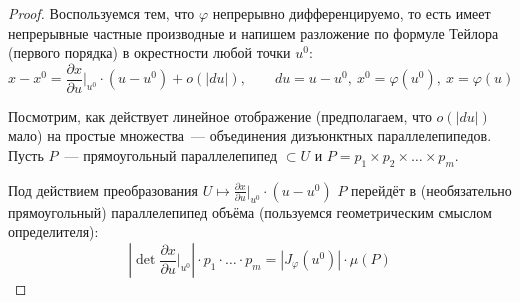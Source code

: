 \begin{proof}
    Воспользуемся тем, что $\varphi$ непрерывно дифференцируемо, то есть имеет непрерывные частные производные и напишем разложение по формуле Тейлора (первого порядка) в окрестности любой точки $u^0$:
    \begin{equation*}
        x-x^0 = \frac{\partial x}{\partial u}\Bigg|_{u^0} \cdot (u - u^0) + o(\lvert du \rvert), \hspace{2em} du = u-u^0,\ x^0 = \varphi(u^0),\ x = \varphi(u)
    \end{equation*}

    Посмотрим, как действует линейное отображение (предполагаем, что $o(|du|)$ мало) на простые множества~--- объединения дизъюнктных параллелепипедов. Пусть $P$~--- прямоугольный параллелепипед $\subset U$ и $P = p_1 \times p_2 \times \dots \times p_m$.

    Под действием преобразования $U \mapsto \frac{\partial x}{\partial u} \Bigg|_{u^0} \cdot (u - u^0)$ $P$ перейдёт в (необязательно прямоугольный) параллелепипед объёма (пользуемся геометрическим смыслом определителя):
    \begin{equation*}
        \left\lvert \det \frac{\partial x}{ \partial u} \Bigg|_{u^0} \right\rvert \cdot p_1 \cdot \dots \cdot p_m = \left\lvert J_\varphi(u^0) \right\rvert \cdot \mu(P)
    \end{equation*}


\end{proof}
